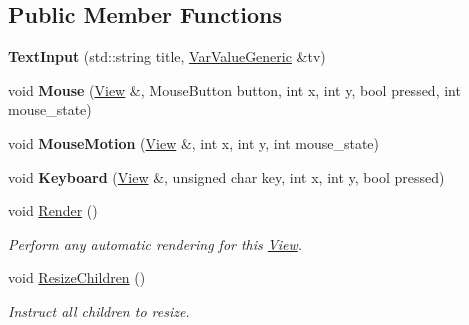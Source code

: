 \subsection*{Public Member Functions}
\begin{DoxyCompactItemize}
\item 
{\bfseries Text\+Input} (std\+::string title, \hyperlink{classpangolin_1_1_var_value_generic}{Var\+Value\+Generic} \&tv)\hypertarget{structpangolin_1_1_text_input_a1e3121ac096852641d4c284250751717}{}\label{structpangolin_1_1_text_input_a1e3121ac096852641d4c284250751717}

\item 
void {\bfseries Mouse} (\hyperlink{structpangolin_1_1_view}{View} \&, Mouse\+Button button, int x, int y, bool pressed, int mouse\+\_\+state)\hypertarget{structpangolin_1_1_text_input_a27d416092e825c4c21322188f643c9cc}{}\label{structpangolin_1_1_text_input_a27d416092e825c4c21322188f643c9cc}

\item 
void {\bfseries Mouse\+Motion} (\hyperlink{structpangolin_1_1_view}{View} \&, int x, int y, int mouse\+\_\+state)\hypertarget{structpangolin_1_1_text_input_a2c6deff3d77227cf4353a9d27553a54e}{}\label{structpangolin_1_1_text_input_a2c6deff3d77227cf4353a9d27553a54e}

\item 
void {\bfseries Keyboard} (\hyperlink{structpangolin_1_1_view}{View} \&, unsigned char key, int x, int y, bool pressed)\hypertarget{structpangolin_1_1_text_input_a069e3ebdc0567c22152d47d96d29c5df}{}\label{structpangolin_1_1_text_input_a069e3ebdc0567c22152d47d96d29c5df}

\item 
void \hyperlink{structpangolin_1_1_text_input_a76fba1c1f6ececafa48b393b5a823944}{Render} ()
\begin{DoxyCompactList}\small\item\em Perform any automatic rendering for this \hyperlink{structpangolin_1_1_view}{View}. \end{DoxyCompactList}\item 
void \hyperlink{structpangolin_1_1_text_input_a2d749a3cd765aebceb05310152559897}{Resize\+Children} ()\hypertarget{structpangolin_1_1_text_input_a2d749a3cd765aebceb05310152559897}{}\label{structpangolin_1_1_text_input_a2d749a3cd765aebceb05310152559897}

\begin{DoxyCompactList}\small\item\em Instruct all children to resize. \end{DoxyCompactList}\end{DoxyCompactItemize}
